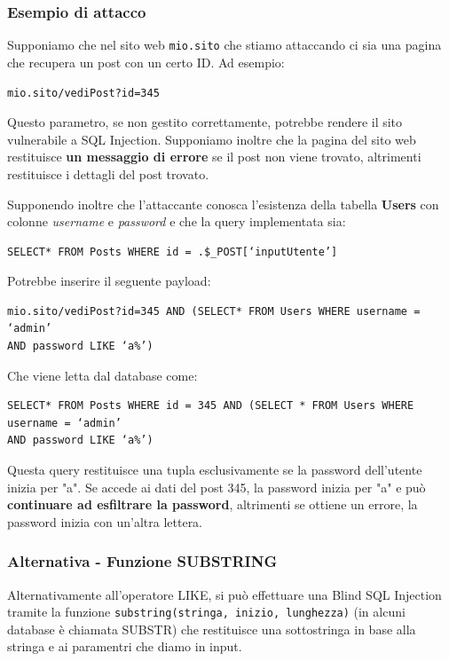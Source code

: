\documentclass{article}
\begin{document}
\newpage
\subsubsection{Esempio di attacco}
Supponiamo che nel sito web \verb|mio.sito| che stiamo attaccando ci sia una pagina che recupera un post con un certo ID. Ad esempio:

\begin{center}
\verb|mio.sito/vediPost?id=345|
\end{center}

Questo parametro, se non gestito correttamente, potrebbe rendere il sito vulnerabile a SQL Injection. Supponiamo inoltre che la pagina del sito web restituisce \textbf{un messaggio di errore} se il post non viene trovato, altrimenti restituisce i dettagli del post trovato.

Supponendo inoltre che l'attaccante conosca l’esistenza della
tabella \textbf{Users} con colonne \textit{username} e \textit{password} e che la query implementata sia:
\begin{verbatim}
SELECT* FROM Posts WHERE id = .$_POST[‘inputUtente’]
\end{verbatim}

Potrebbe inserire il seguente payload:
\begin{verbatim}
mio.sito/vediPost?id=345 AND (SELECT* FROM Users WHERE username = ‘admin’ 
AND password LIKE ‘a%’)
\end{verbatim}

Che viene letta dal database come:
\begin{verbatim}
SELECT* FROM Posts WHERE id = 345 AND (SELECT * FROM Users WHERE username = ‘admin’ 
AND password LIKE ‘a%’)
\end{verbatim}

Questa query restituisce una tupla esclusivamente se la password dell'utente inizia per "a". Se accede ai dati del post 345, la password inizia per "a" e può \textbf{continuare ad esfiltrare la password}, altrimenti se ottiene un errore, la password inizia con un'altra lettera.

\subsubsection{Alternativa - Funzione SUBSTRING}
Alternativamente all'operatore LIKE, si può effettuare una Blind SQL Injection tramite la funzione \verb|substring(stringa, inizio, lunghezza)| (in alcuni database è chiamata SUBSTR) che restituisce una sottostringa in base alla stringa e ai paramentri che diamo in input. 
\end{document}
